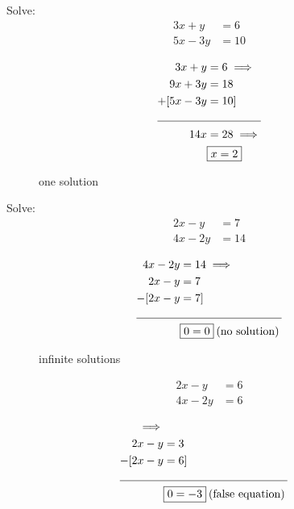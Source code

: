\begin{example}

Solve:
\begin{align*}
	3x + y &= 6 \\
	5x -3y &= 10
\end{align*}
\end{example}

\begin{solution}[]
	\begin{align*}
		3x + y &= 6 \implies \\
		9x + 3y &= 18 \\
		+[5x -3y &= 10] \\
		\cline{1-2}
		14x &= 28 \implies \\
			&\boxed{x = 2}
	\end{align*}
\end{solution}
\begin{figure}[ht]
    \centering
    \caption{one solution}
    \label{fig:one-solution}
\end{figure}

\begin{example}
	Solve:
\begin{align*}
	2x - y &= 7 \\
4x - 2y &= 14
\end{align*}

\end{example}

\begin{solution}[]
	\begin{align*}
		4x - 2y &= 14 \implies \\
	2x - y &= 7 \\
	-[2x - y &= 7] \\
	\cline{1-2}
			 &\boxed{0=0}\:\text{(no solution)}\:
	\end{align*}
\end{solution}
\begin{figure}[ht]
    \centering
    \caption{infinite solutions}
    \label{fig:infinite-solutions}
\end{figure}

\begin{example}[No solutions]
	\begin{align*}
		2x - y &= 6 \\
		4x - 2y &= 6
	\end{align*}
\end{example}

\begin{solution}[]
	\begin{align*}
		[4x - 2y &= 6] \implies \\
		2x - y &= 3 \\
		-[2x - y &= 6] \\
		\cline{1-2}
				 &\boxed{0=-3}\:\text{(false equation)}\:
	\end{align*}
\end{solution}



\newpage


